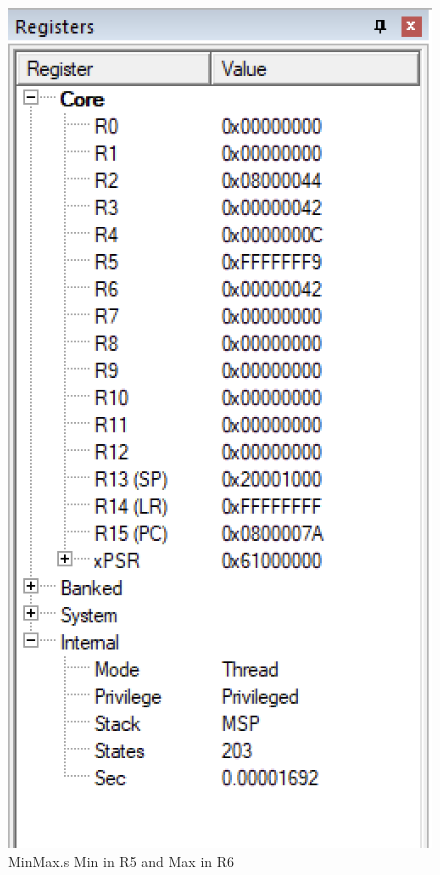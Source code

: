 \documentclass{article}
\begin{document}
\begin{figure}
\centering
\caption{MinMax.s Min in R5 and Max in R6}
\includegraphics{../Images/minMax_register_vals.png}
\end{figure}
\end{document}
